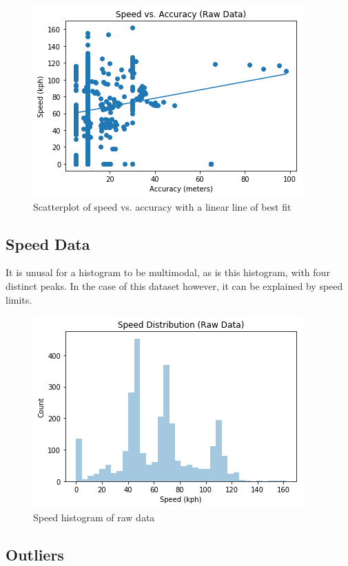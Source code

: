 \documentclass[12pt]{article}
\begin{document}
\begin{figure}[h]
	\centering
	\includegraphics[scale= 0.9]{speed_vs_accuracy_raw.png}
	\caption{Scatterplot of speed vs. accuracy with a linear line of best fit}
	\label{summary1}
\end{figure}

\subsection{Speed Data}

It is unusal for a histogram to be multimodal, as is this histogram, with four distinct peaks. In the case of this dataset however, it can be explained by speed limits. 

\begin{figure}[h]
	\centering
	\includegraphics[scale= 1.0]{speed_hist_raw.png}
	\caption{Speed histogram of raw data}
	\label{mg:screenshot}
\end{figure}

\subsection{Outliers}
\end{document}
